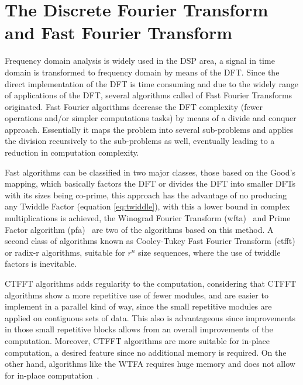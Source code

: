 \chapter{The Discrete Fourier Transform and Fast Fourier Transform}
Frequency domain analysis is widely used in the DSP area, a signal in time domain is transformed to frequency domain by means of the DFT. Since the direct implementation of the DFT is time consuming and due to the widely range of applications of the DFT, several algorithms called of Fast Fourier Transforms originated. Fast Fourier algorithms decrease the DFT complexity (fewer operations and/or simpler computations tasks) by means of a divide and conquer approach. Essentially it maps the problem into several sub-problems and applies the division recursively to the sub-problems as well, eventually leading to a reduction in computation complexity. 

Fast algorithms can be classified in two major classes, those based on the Good's mapping, which basically factors the DFT or divides the DFT into smaller DFTs with its sizes being co-prime, this approach has the advantage of no producing any Twiddle Factor (equation \ref{eq:twiddle}), with this a lower bound in complex multiplications is achieved, the Winograd Fourier Transform (\ac{wfta})~\cite{winograd1978computing} and Prime Factor algorithm (\ac{pfa})~\cite{pfa_fft} are two of the algorithms based on this method. A second class of algorithms known as Cooley-Tukey Fast Fourier Transform (\ac{ctfft}) or radix-r algorithms, suitable for $r^n$ size sequences, where the use of twiddle factors is inevitable.

CTFFT algorithms adds regularity to the computation, considering that CTFFT algorithms show a more repetitive use of fewer modules, and are easier to implement in a parallel kind of way, since the small repetitive modules are applied on contiguous sets of data. This also is advantageous since improvements in those small repetitive blocks allows from an overall improvements of the computation. Moreover, CTFFT algorithms are more suitable for in-place computation, a desired feature since no additional memory is required. On the other hand, algorithms like the WTFA requires huge memory and does not allow for in-place computation~\cite{duhamel1990fast}. 


